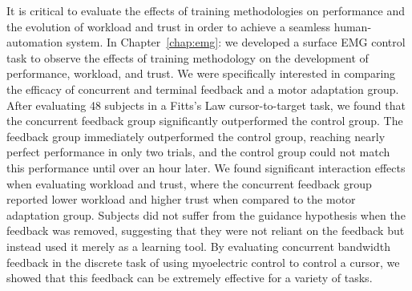 It is critical to evaluate the effects of training methodologies on performance and the evolution of workload and trust in order to achieve a seamless human-automation system.
In Chapter~\ref{chap:emg}:  we developed a surface EMG control task to observe the effects of training methodology on the development of performance, workload, and trust.
We were specifically interested in comparing the efficacy of concurrent and terminal feedback and a motor adaptation group.
After evaluating 48 subjects in a Fitts's Law cursor-to-target task, we found that the concurrent feedback group significantly outperformed the control group.
The feedback group immediately outperformed the control group, reaching nearly perfect performance in only two trials, and the control group could not match this performance until over an hour later.
We found significant interaction effects when evaluating workload and trust, where the concurrent feedback group reported lower workload and higher trust when compared to the motor adaptation group.
Subjects did not suffer from the guidance hypothesis when the feedback was removed, suggesting that they were not reliant on the feedback but instead used it merely as a learning tool.
By evaluating concurrent bandwidth feedback in the discrete task of using myoelectric control to control a cursor, we showed that this feedback can be extremely effective for a variety of tasks.

